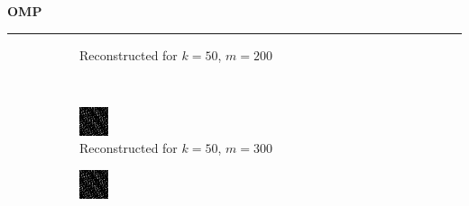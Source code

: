 \documentclass[a4paper,12pt]{article}
\newenvironment{solution}[2][]{%
    \begin{mdframed}[linecolor=blue!70!black, linewidth=2pt, roundcorner=10pt, backgroundcolor=yellow!10!white, skipabove=12pt, skipbelow=12pt]%
        \textbf{\large #2}
        \par\noindent\rule{\textwidth}{0.4pt}
}{
    \end{mdframed}
}
\begin{document}
\begin{solution}{OMP}
\begin{figure}[H]
\begin{subfigure}[t]{0.23\textwidth}
        \caption{Reconstructed for $k = 50$, $m = 200$}
    \end{subfigure}\\
    \begin{subfigure}[t]{0.23\textwidth}
        \centering
        \includegraphics[width=\textwidth]{../images/omp/Reconstructed_k_50_m_300.png}
        \caption{Reconstructed for $k = 50$, $m = 300$}
    \end{subfigure}
    \begin{subfigure}[t]{0.23\textwidth}
        \centering
        \includegraphics[width=\textwidth]{../images/omp/Reconstructed_k_50_m_400.png}

\end{subfigure}
\end{figure}
\end{solution}
\end{document}
